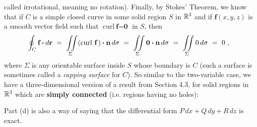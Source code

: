 called irrotational, meaning no rotation).
\newpage
Finally, by Stokes' Theorem, we know that if $C$ is a simple closed curve in some solid region $S$ in $\mathbb{R}^{3}$ and if
$\textbf{f}(x,y,z)$ is a smooth vector field such that $\text{curl}~\textbf{f} = \textbf{0}$ in $S$, then
\begin{displaymath}
 \oint_{C} \textbf{f} \bm{\cdot} d\textbf{r} ~=~ \iint\limits_{\Sigma} (\text{curl}~{\textbf{f}}\,) \bm{\cdot} \textbf{n}\,d\sigma ~=~
   \iint\limits_{\Sigma} \textbf{0} \bm{\cdot} \textbf{n}\,d\sigma ~=~ \iint\limits_{\Sigma} 0\,d\sigma ~=~ 0 ~,
\end{displaymath}
where $\Sigma$ is any orientable surface inside $S$ whose boundary is $C$ (such a surface is sometimes called a
\emph{capping surface} for $C$).
So similar to the two-variable case, we have a three-dimensional version of a result from Section 4.3, for solid regions
in $\mathbb{R}^{3}$ which are \textbf{simply connected} (i.e. regions having no holes):

\vspace{3mm}
\vspace{3mm}

\par\noindent Part (d) is also a way of saying that the differential form $P\,dx + Q\,dy + R\,dz$ is exact.
 
